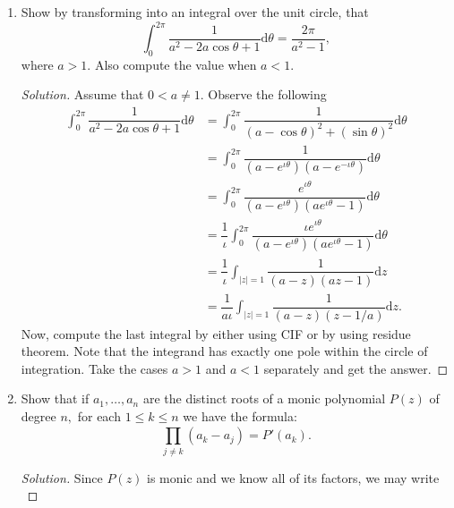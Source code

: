 \documentclass[12pt]{article}
\theoremstyle{definition}
\newenvironment{soln}{\begin{proof}[Solution]}{\end{proof}}
\begin{document}
\begin{enumerate}[leftmargin=*]
\begin{soln}
    	The final answer should come out to be $\boxed{\dfrac{\pi}{e}}.$ {\color{myupdatecolor}(The answer I wrote earlier was off by a factor of $2.$)}
    \end{soln}
    \item Show by transforming into an integral over the unit circle, that
    \begin{equation*} 
    	\int_{0}^{2\pi} \dfrac{1}{a^2 - 2a\cos\theta + 1} {\mathrm{d}}\theta = \dfrac{2\pi}{a^2 - 1},
    \end{equation*}
    where $a > 1.$ Also compute the value when $a < 1.$
    \begin{soln}
    	Assume that $0 < a \neq 1.$ Observe the following
    	\begin{align*} 
    		\int_{0}^{2\pi} \dfrac{1}{a^2 - 2a\cos\theta + 1} {\mathrm{d}}\theta &= \int_{0}^{2\pi} \dfrac{1}{(a - \cos\theta)^2 + (\sin \theta)^2} {\mathrm{d}}\theta\\
    		&= \int_{0}^{2\pi} \dfrac{1}{(a - e^{\iota\theta})(a - e^{-\iota\theta})} {\mathrm{d}}\theta\\
    		&= \int_{0}^{2\pi} \dfrac{e^{\iota\theta}}{(a - e^{\iota\theta})(ae^{\iota\theta} - 1)} {\mathrm{d}}\theta\\
    		&= \dfrac{1}{\iota}\int_{0}^{2\pi} \dfrac{\iota	e^{\iota\theta}}{(a - e^{\iota\theta})(ae^{\iota\theta} - 1)} {\mathrm{d}}\theta\\
    		&= \dfrac{1}{\iota}\int_{|z| = 1}^{} \dfrac{1}{(a - z)(az - 1)} {\mathrm{d}}z\\
    		&= \dfrac{1}{a\iota}\int_{|z| = 1}^{} \dfrac{1}{(a - z)(z - 1/a)} {\mathrm{d}}z.
    	\end{align*}
    	Now, compute the last integral by either using CIF or by using residue theorem. Note that the integrand has exactly one pole within the circle of integration. Take the cases $a > 1$ and $a < 1$ separately and get the answer.
    \end{soln}
    \item Show that if $a_1, \ldots, a_n$ are the distinct roots of a monic polynomial $P(z)$ of degree $n,$ for each $1 \le k \le n$  we have the formula:
    \begin{equation*} 
    	\prod_{j \neq k}^{}(a_k - a_j) = P'(a_k).
    \end{equation*}
    \begin{soln}
    	Since $P(z)$ is monic and we know all of its factors, we may write
    	\begin{equation*} 

\end{equation*}
\end{soln}
\end{enumerate}
\end{document}
